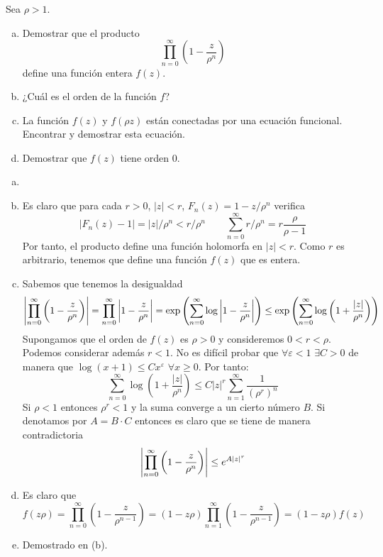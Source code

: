 \documentclass[twoside]{article}
\begin{document}
\begin{ejercicio}{3}
Sea $\rho>1$.
\begin{enumerate}[(a)]
\item Demostrar que el producto
$$
\prod_{n=0}^\infty \left(1-\frac{z}{\rho^n}\right) 
$$
define una función entera $f(z)$.
\item ¿Cuál es el orden de la función $f$?
\item La función $f(z)$ y $f(\rho z)$ están conectadas por una ecuación funcional. Encontrar y demostrar esta ecuación.
\item Demostrar que $f(z)$ tiene orden $0$.
\end{enumerate}
\end{ejercicio}
\begin{solucion}
\begin{enumerate}[(a)]
\item[]
\item Es claro que para cada $r>0$, $|z|< r$, $F_n(z)=1-z/\rho^n$ verifica 
$$
|F_n(z)-1| = |z|/\rho^n < r/\rho^n \qquad \sum_{n=0}^\infty r/\rho^n = r \frac{\rho}{\rho-1}
$$
Por tanto, el producto define una función holomorfa en $|z|<r$. Como $r$ es arbitrario, tenemos que define una función $f(z)$ que es entera.
\item Sabemos que tenemos la desigualdad
$$
\left\lvert\prod_{n=0}^\infty \left(1-\frac{z}{\rho^n}\right)\right\rvert  = \prod_{n=0}^\infty \left\lvert1-\frac{z}{\rho^n}\right\rvert = \exp\left(\sum_{n=0}^\infty \log \left\lvert1-\frac{z}{\rho^n}\right\rvert\right) \leq  \exp\left(\sum_{n=0}^\infty \log \left({1+\frac{|z|}{\rho^n}}\right)\right)
$$
Supongamos que el orden de $f(z)$ es $\rho>0$ y consideremos $0<r<\rho$. Podemos considerar además $r<1$. No es difícil probar que $\forall \varepsilon < 1$ $\exists C >0$ de manera que $\log(x+1)\leq C x^\varepsilon$ $\forall x \geq 0$. Por tanto:
$$
\sum_{n=0}^\infty \log \left({1+\frac{|z|}{\rho^n}}\right) \leq C |z|^{r}\sum_{n=1}^\infty \frac{1}{(\rho^{r})^n}
$$
Si $\rho<1$ entonces $\rho^{r}<1$ y la suma converge a un cierto número $B$. Si denotamos por $A = B\cdot C$ entonces es claro que se tiene de manera contradictoria
$$
\left\lvert\prod_{n=0}^\infty \left(1-\frac{z}{\rho^n}\right)\right\rvert \leq e^{A|z|^{r}}
$$
\item Es claro que 
$$
f(z\rho) = \prod_{n=0}^\infty  \left(1-\frac{z}{\rho^{n-1}}\right)  = (1-z\rho)\prod_{n=1}^\infty  \left(1-\frac{z}{\rho^{n-1}}\right)  = (1-z\rho)f(z)
$$
\item Demostrado en (b).
\end{enumerate}
\end{solucion}
\end{document}
